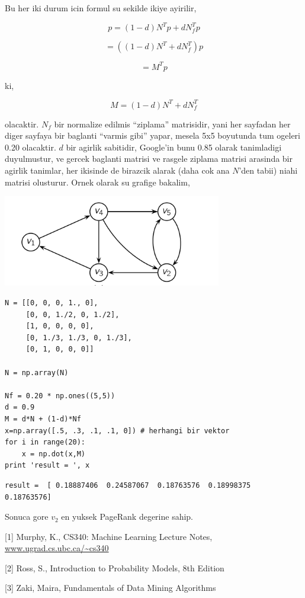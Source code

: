 \documentclass[12pt,fleqn]{article}\usepackage{../common}
\begin{document}
Bu her iki durum icin formul su sekilde ikiye ayirilir,

$$ p = (1-d)N^Tp + dN_f^Tp $$

$$ = ((1-d)N^T + dN_f^T) p $$

$$ = M^Tp $$

ki,

$$M = (1-d)N^T + dN_f^T$$ 

olacaktir. $N_f$ bir normalize edilmis ``ziplama'' matrisidir, yani her
sayfadan her diger sayfaya bir baglanti ``varmis gibi'' yapar, mesela 5x5
boyutunda tum ogeleri 0.20 olacaktir. $d$ bir agirlik sabitidir, Google'in
bunu 0.85 olarak tanimladigi duyulmustur, ve gercek baglanti matrisi ve
rasgele ziplama matrisi arasinda bir agirlik tanimlar, her ikisinde de
birazcik alarak (daha cok ana $N$'den tabii) niahi matrisi olusturur. Ornek
olarak su grafige bakalim, 

\includegraphics[height=4cm]{pg3.png}

\begin{verbatim}
N = [[0, 0, 0, 1., 0],
     [0, 0, 1./2, 0, 1./2],
     [1, 0, 0, 0, 0],
     [0, 1./3, 1./3, 0, 1./3],
     [0, 1, 0, 0, 0]]

N = np.array(N)

Nf = 0.20 * np.ones((5,5))
d = 0.9
M = d*N + (1-d)*Nf
x=np.array([.5, .3, .1, .1, 0]) # herhangi bir vektor
for i in range(20): 
    x = np.dot(x,M)
print 'result = ', x
\end{verbatim}

\begin{verbatim}
result =  [ 0.18887406  0.24587067  0.18763576  0.18998375  0.18763576]
\end{verbatim}

Sonuca gore $v_2$ en yuksek PageRank degerine sahip. 

[1] Murphy, K., CS340: Machine Learning Lecture Notes, \url{www.ugrad.cs.ubc.ca/~cs340}

[2] Ross, S., Introduction to Probability Models, 8th Edition

[3] Zaki, Maira, Fundamentals of Data Mining Algorithms
\end{document}
